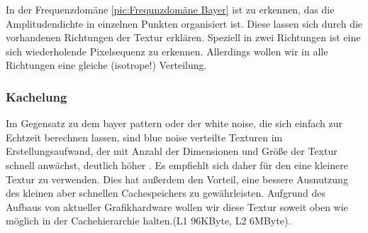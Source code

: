 In der Frequenzdomäne \ref{pic:Frequnzdomäne Bayer} ist zu erkennen, das die Amplitudendichte in einzelnen
Punkten organisiert ist. Diese lassen sich durch die vorhandenen
Richtungen der Textur erklären. Speziell in zwei Richtungen ist eine sich
wiederholende Pixelsequenz zu erkennen.
Allerdings wollen wir in alle Richtungen eine gleiche (isotrope!) 
Verteilung.

\subsubsection{Kachelung}
\label{ch:Content1:sec:blue noise:Kachelung}

Im Gegensatz zu dem bayer pattern oder der white noise, die sich einfach zur Echtzeit berechnen lassen,
sind blue noise verteilte Texturen im Erstellungsaufwand, der mit Anzahl der Dimensionen 
und Größe der Textur schnell anwächst, deutlich höher \cite{bluenoisechrisschied}. 
Es empfiehlt sich daher für den  eine kleinere Textur zu verwenden.
Dies hat außerdem den Vorteil, eine bessere Ausnutzung des kleinen aber schnellen Cachespeichers zu gewährleisten.
Aufgrund des Aufbaus von aktueller Grafikhardware \cite{turingarchitecture} wollen wir diese Textur
soweit oben wie möglich in der Cachehierarchie halten.(L1 96KByte, L2 6MByte).

